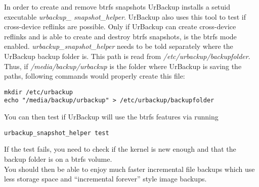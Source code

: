 \documentclass[a4paper,10pt]{article}
\begin{document}
\noindent In order to create and remove btrfs snapshots UrBackup installs a setuid
executable \textsl{urbackup\_ snapshot\_helper}. UrBackup also uses this tool to
test if cross-device reflinks are possible. Only if UrBackup can create
cross-device reflinks and is able to create and destroy btrfs snapshots, is the
btrfs mode enabled. \textsl{urbackup\_snapshot\_helper} needs to be told separately
where the UrBackup backup folder is. This path is read from \textsl{/etc/urbackup/backupfolder}.
Thus, if \textsl{/media/backup/urbackup} is the folder where UrBackup is saving
the paths, following commands would properly create this file:
\begin{verbatim}
mkdir /etc/urbackup
echo "/media/backup/urbackup" > /etc/urbackup/backupfolder
\end{verbatim}
You can then test if UrBackup will use the btrfs features via running
\begin{verbatim}
urbackup_snapshot_helper test
\end{verbatim}
If the test fails, you need to check if the kernel is new enough and
that the backup folder is on a btrfs volume.\\

\noindent You should then be able to enjoy much faster incremental file backups which use less storage space
and ``incremental forever'' style image backups.
\end{document}
